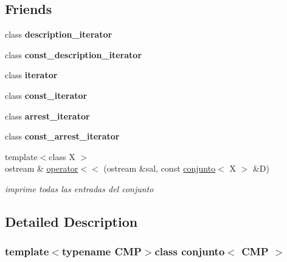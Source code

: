 \subsection*{Friends}
\begin{DoxyCompactItemize}
\item 
\hypertarget{classconjunto_a1f956dc6494785c3139e78f0461a0d79}{}class {\bfseries description\+\_\+iterator}\label{classconjunto_a1f956dc6494785c3139e78f0461a0d79}

\item 
\hypertarget{classconjunto_a94bb81fe23207e5e2e02998e35339080}{}class {\bfseries const\+\_\+description\+\_\+iterator}\label{classconjunto_a94bb81fe23207e5e2e02998e35339080}

\item 
\hypertarget{classconjunto_a67171474c4da6cc8efe0c7fafefd2b2d}{}class {\bfseries iterator}\label{classconjunto_a67171474c4da6cc8efe0c7fafefd2b2d}

\item 
\hypertarget{classconjunto_ac220ce1c155db1ac44146c12d178056f}{}class {\bfseries const\+\_\+iterator}\label{classconjunto_ac220ce1c155db1ac44146c12d178056f}

\item 
\hypertarget{classconjunto_a65d16dbfcb2013bef4406fd55746cd2b}{}class {\bfseries arrest\+\_\+iterator}\label{classconjunto_a65d16dbfcb2013bef4406fd55746cd2b}

\item 
\hypertarget{classconjunto_a9a6448ab80236b81754c8636d1c5fd9f}{}class {\bfseries const\+\_\+arrest\+\_\+iterator}\label{classconjunto_a9a6448ab80236b81754c8636d1c5fd9f}

\item 
{\footnotesize template$<$class X $>$ }\\ostream \& \hyperlink{classconjunto_a0f88854a255d61f1e85c69c294780230}{operator$<$$<$} (ostream \&sal, const \hyperlink{classconjunto}{conjunto}$<$ X $>$ \&D)
\begin{DoxyCompactList}\small\item\em imprime todas las entradas del conjunto \end{DoxyCompactList}\end{DoxyCompactItemize}


\subsection{Detailed Description}
\subsubsection*{template$<$typename C\+M\+P$>$class conjunto$<$ C\+M\+P $>$}

